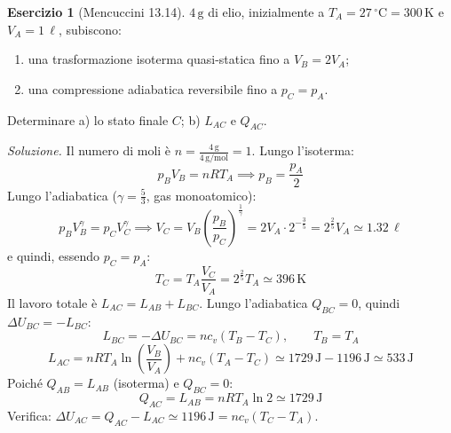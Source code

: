 \documentclass[11pt, a4paper, openright]{book}
\theoremstyle{plain}
\theoremstyle{definition}
\newtheorem{esercizio}[teorema]{Esercizio}
\theoremstyle{remark}
\begin{document}
\begin{esercizio}[Mencuccini 13.14]
    $4\,\text{g}$ di elio, inizialmente a $T_A = 27\,^\circ\text{C} = 300\,\text{K}$ e $V_A = 1\,\ell$, subiscono:
    \begin{enumerate}
        \item una trasformazione isoterma quasi-statica fino a $V_B = 2V_A$;
        \item una compressione adiabatica reversibile fino a $p_C = p_A$.
    \end{enumerate}
    Determinare a) lo stato finale $C$; b) $L_{AC}$ e $Q_{AC}$.

    \textit{Soluzione.} Il numero di moli è $n = \frac{4\,\text{g}}{4\,\text{g/mol}} = 1$. Lungo l'isoterma:
    \begin{equation}
        p_BV_B = nRT_A \implies p_B = \frac{p_A}{2}
    \end{equation}
    Lungo l'adiabatica ($\gamma = \frac{5}{3}$, gas monoatomico):
    \begin{equation}
        p_BV_B^\gamma = p_CV_C^\gamma \implies V_C = V_B\left(\frac{p_B}{p_C}\right)^{\frac{1}{\gamma}} = 2V_A \cdot 2^{-\frac{3}{5}} = 2^{\frac{2}{5}}V_A \simeq 1.32\,\ell
    \end{equation}
    e quindi, essendo $p_C = p_A$:
    \begin{equation}
        T_C = T_A\frac{V_C}{V_A} = 2^{\frac{2}{5}}T_A \simeq 396\,\text{K}
    \end{equation}
    Il lavoro totale è $L_{AC} = L_{AB} + L_{BC}$. Lungo l'adiabatica $Q_{BC} = 0$, quindi $\Delta U_{BC} = -L_{BC}$:
    \begin{equation}
        L_{BC} = -\Delta U_{BC} = nc_v(T_B - T_C), \qquad T_B = T_A
    \end{equation}
    \begin{equation}
        L_{AC} = nRT_A\ln\left(\frac{V_B}{V_A}\right) + nc_v(T_A - T_C) \simeq 1729\,\text{J} - 1196\,\text{J} \simeq 533\,\text{J}
    \end{equation}
    Poiché $Q_{AB} = L_{AB}$ (isoterma) e $Q_{BC} = 0$:
    \begin{equation}
        Q_{AC} = L_{AB} = nRT_A\ln 2 \simeq 1729\,\text{J}
    \end{equation}
    Verifica: $\Delta U_{AC} = Q_{AC} - L_{AC} \simeq 1196\,\text{J} = nc_v(T_C - T_A)$.
\end{esercizio}
\end{document}
